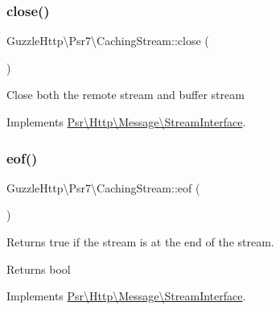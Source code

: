 \subsubsection{\texorpdfstring{close()}{close()}}
{\footnotesize\ttfamily Guzzle\+Http\textbackslash{}\+Psr7\textbackslash{}\+Caching\+Stream\+::close (\begin{DoxyParamCaption}{ }\end{DoxyParamCaption})}

Close both the remote stream and buffer stream 

Implements \hyperlink{interfacePsr_1_1Http_1_1Message_1_1StreamInterface_a0bbd0c821da0ee0c319f9867ff77c598}{Psr\textbackslash{}\+Http\textbackslash{}\+Message\textbackslash{}\+Stream\+Interface}.

\mbox{\label{classGuzzleHttp_1_1Psr7_1_1CachingStream_ae247cc3e854b0e58fc4b00a0b5fcc9ab}} 
\subsubsection{\texorpdfstring{eof()}{eof()}}
{\footnotesize\ttfamily Guzzle\+Http\textbackslash{}\+Psr7\textbackslash{}\+Caching\+Stream\+::eof (\begin{DoxyParamCaption}{ }\end{DoxyParamCaption})}

Returns true if the stream is at the end of the stream.

\begin{DoxyReturn}{Returns}
bool 
\end{DoxyReturn}


Implements \hyperlink{interfacePsr_1_1Http_1_1Message_1_1StreamInterface_a502cc5ca370c6925b78d95d86d68777c}{Psr\textbackslash{}\+Http\textbackslash{}\+Message\textbackslash{}\+Stream\+Interface}.

\mbox{\label{classGuzzleHttp_1_1Psr7_1_1CachingStream_a4a4c0693dfcec940ea1f14c686666a4d}} 
